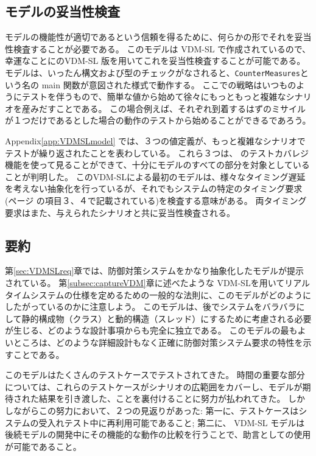 \documentclass[\pformat,12pt]{jreport}
\begin{document}
\subsection{モデルの妥当性検査}

モデルの機能性が適切であるという信頼を得るために、何らかの形でそれを妥当性検査することが必要である。
このモデルは VDM-SL で作成されているので、幸運なことに\VDMTools のVDM-SL 版を用いてこれを妥当性検査することが可能である。
モデルは、いったん構文および型のチェックがなされると、\texttt{CounterMeasures}という名の main 関数が意図された様式で動作する。
ここでの戦略はいつものようにテストを伴うもので、簡単な値から始めて徐々にもっともっと複雑なシナリオを産みだすことである。
この場合例えば、それぞれ到着するはずのミサイルが１つだけであるとした場合の動作のテストから始めることができるであろう。

Appendix\ref{app:VDMSLmodel} では、３つの値定義が、もっと複雑なシナリオでテストが繰り返されたことを表わしている。
これら３つは、 \VDMTools のテストカバレジ機能を使って見ることができて、十分にモデルのすべての部分を対象としていることが判明した。
このVDM-SLによる最初のモデルは、様々なタイミング遅延を考えない抽象化を行っているが、それでもシステムの特定のタイミング要求(\pageref{timereq34}ページ の項目３、４で記載されている)を検査する意味がある。
両タイミング要求はまた、与えられたシナリオと共に妥当性検査される。

\subsection{要約}

第\ref{sec:VDMSLreq}章では、防御対策システムをかなり抽象化したモデルが提示されている。
第\ref{subsec:captureVDM}章に述べたような VDM-SLを用いてリアルタイムシステムの仕様を定めるための一般的な法則に、このモデルがどのようにしたがっているのかに注意しよう。
このモデルは、後でシステムをバラバラにして静的構成物（クラス）と動的構造（スレッド）にするために考慮される必要が生じる、どのような設計事項からも完全に独立である。
このモデルの最もよいところは、どのような詳細設計もなく正確に防御対策システム要求の特性を示すことである。

このモデルはたくさんのテストケースでテストされてきた。
時間の重要な部分については、これらのテストケースがシナリオの広範囲をカバーし、モデルが期待された結果を引き渡した、ことを裏付けることに努力が払われてきた。
しかしながらこの努力において、２つの見返りがあった: 第一に、テストケースはシステムの受入れテスト中に再利用可能であること; 第二に、 VDM-SL モデルは後続モデルの開発中にその機能的な動作の比較を行うことで、助言としての使用が可能であること。
\end{document}
